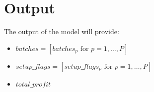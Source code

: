 \documentclass{article}
\begin{document}
\section*{Output}
The output of the model will provide:
\begin{itemize}
    \item \(batches = [batches_{p} \text{ for } p = 1, \ldots, P]\)
    \item \(setup\_flags = [setup\_flags_{p} \text{ for } p = 1, \ldots, P]\)
    \item \(total\_profit\)
\end{itemize}
\end{document}
